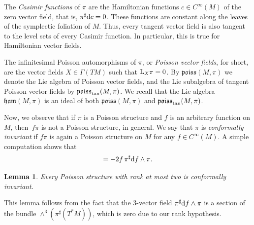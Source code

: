\documentclass[10pt,a4paper]{amsart}
\newcommand{\dd}{{\rm d}}
\numberwithin{equation}{section}
\newtheorem{Lemma}[Theorem]{Lemma}
\begin{document}
The \emph{Casimir functions} of $\pi$ are the Hamiltonian functions $c \in C^{\infty}(M)$ of the zero vector field, that is, $\pi^{\sharp}\dd{c} = 0$. These functions are constant along the leaves of the symplectic foliation of $M$. Thus, every tangent vector field is also tangent to the level sets of every Casimir function. In particular, this is true for Hamiltonian vector fields.

The infinitesimal Poisson automorphisms of $\pi$, or \emph{Poisson vector fields}, for short, are the vector fields $X \in \Gamma(TM)$ such that ${\rm L}_{X}\pi = 0$. By $\mathfrak{poiss}(M,\pi)$ we denote the Lie algebra of Poisson vector fields, and the Lie subalgebra of tangent Poisson vector fields by $\mathfrak{poiss}_{{\rm tan}}(M,\pi)$. We recall that the Lie algebra $\mathfrak{ham}(M,\pi)$ is an ideal of both $\mathfrak{poiss}(M,\pi)$ and $\mathfrak{poiss}_{{\rm tan}}(M,\pi)$.

Now, we observe that if $\pi$ is a Poisson structure and $f$ is an arbitrary function on $M$, then~$f\pi$ is not a Poisson structure, in general. We say that $\pi$ is \emph{conformally invariant} if $f\pi$ is again a Poisson structure on $M$ for any $f \in C^{\infty}(M)$. A simple computation shows that
 \begin{equation*}
 [f\pi, f\pi] = -2f\,\pi^{\sharp}\dd{f} \wedge \pi.
 \end{equation*}

\begin{Lemma}\label{lemma:conformally}
Every Poisson structure with rank at most two is conformally invariant.
\end{Lemma}

This lemma follows from the fact that the 3-vector field $\pi^{\sharp} \dd{f} \wedge \pi$ is a section of the bundle $\wedge^3(\pi^{\sharp}(T^{*}M))$, which is zero due to our rank hypothesis.
\end{document}

